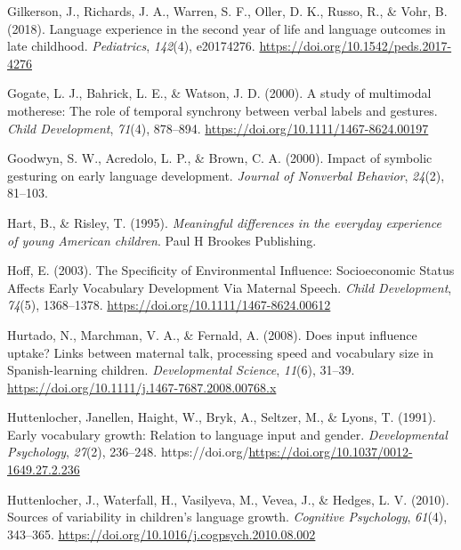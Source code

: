 \documentclass[
  man,floatsintext]{apa6}
\newlength{\cslhangindent}
\newlength{\cslentryspacingunit} %
\newenvironment{CSLReferences}[2] %
 {%
  \setlength{\parindent}{0pt}
  \ifodd #1
  \let\oldpar\par
  \def\par{\hangindent=\cslhangindent\oldpar}
  \fi
  \setlength{\parskip}{#2\cslentryspacingunit}
 }%
 {}
\begin{document}
\begin{CSLReferences}{1}{0}
\leavevmode{}%
Gilkerson, J., Richards, J. A., Warren, S. F., Oller, D. K., Russo, R., \& Vohr, B. (2018). Language experience in the second year of life and language outcomes in late childhood. \emph{Pediatrics}, \emph{142}(4), e20174276. \url{https://doi.org/10.1542/peds.2017-4276}

\leavevmode{}%
Gogate, L. J., Bahrick, L. E., \& Watson, J. D. (2000). A study of multimodal motherese: {The} role of temporal synchrony between verbal labels and gestures. \emph{Child Development}, \emph{71}(4), 878--894. \url{https://doi.org/10.1111/1467-8624.00197}

\leavevmode{}%
Goodwyn, S. W., Acredolo, L. P., \& Brown, C. A. (2000). Impact of symbolic gesturing on early language development. \emph{Journal of Nonverbal Behavior}, \emph{24}(2), 81--103.

\leavevmode{}%
Hart, B., \& Risley, T. (1995). \emph{Meaningful differences in the everyday experience of young {American} children}. Paul H Brookes Publishing.

\leavevmode{}%
Hoff, E. (2003). The {Specificity} of {Environmental} {Influence}: {Socioeconomic} {Status} {Affects} {Early} {Vocabulary} {Development} {Via} {Maternal} {Speech}. \emph{Child Development}, \emph{74}(5), 1368--1378. \url{https://doi.org/10.1111/1467-8624.00612}

\leavevmode{}%
Hurtado, N., Marchman, V. A., \& Fernald, A. (2008). Does input influence uptake? {Links} between maternal talk, processing speed and vocabulary size in {Spanish}-learning children. \emph{Developmental Science}, \emph{11}(6), 31--39. \url{https://doi.org/10.1111/j.1467-7687.2008.00768.x}

\leavevmode{}%
Huttenlocher, Janellen, Haight, W., Bryk, A., Seltzer, M., \& Lyons, T. (1991). Early vocabulary growth: {Relation} to language input and gender. \emph{Developmental Psychology}, \emph{27}(2), 236--248. https://doi.org/\url{https://doi.org/10.1037/0012-1649.27.2.236}

\leavevmode{}%
Huttenlocher, J., Waterfall, H., Vasilyeva, M., Vevea, J., \& Hedges, L. V. (2010). Sources of variability in children's language growth. \emph{Cognitive Psychology}, \emph{61}(4), 343--365. \url{https://doi.org/10.1016/j.cogpsych.2010.08.002}


\end{CSLReferences}
\end{document}
